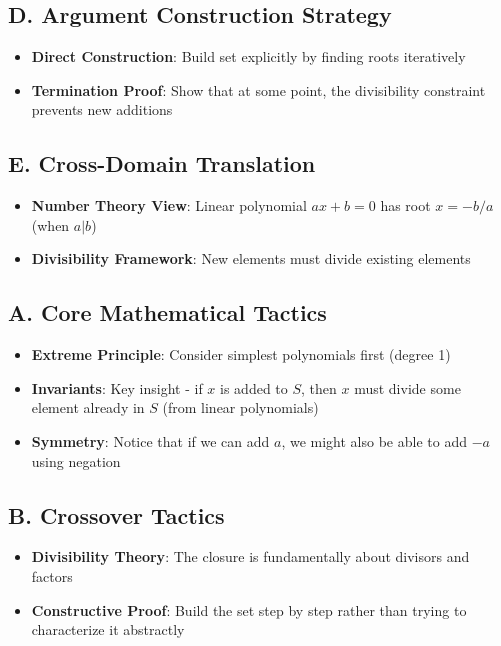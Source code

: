 \documentclass[12pt]{article}
\begin{document}
\begin{strategicbox}
\subsection*{D. Argument Construction Strategy}
\begin{itemize}[leftmargin=*]
    \item \textbf{Direct Construction}: Build set explicitly by finding roots iteratively
    \item \textbf{Termination Proof}: Show that at some point, the divisibility constraint prevents new additions
\end{itemize}

\subsection*{E. Cross-Domain Translation}
\begin{itemize}[leftmargin=*]
    \item \textbf{Number Theory View}: Linear polynomial $ax + b = 0$ has root $x = -b/a$ (when $a | b$)
    \item \textbf{Divisibility Framework}: New elements must divide existing elements
\end{itemize}
\end{strategicbox}

\begin{tacticalbox}
\subsection*{A. Core Mathematical Tactics}
\begin{itemize}[leftmargin=*]
    \item \textbf{Extreme Principle}: Consider simplest polynomials first (degree 1)
    \item \textbf{Invariants}: Key insight - if $x$ is added to $S$, then $x$ must divide some element already in $S$ (from linear polynomials)
    \item \textbf{Symmetry}: Notice that if we can add $a$, we might also be able to add $-a$ using negation
\end{itemize}

\subsection*{B. Crossover Tactics}
\begin{itemize}[leftmargin=*]
    \item \textbf{Divisibility Theory}: The closure is fundamentally about divisors and factors
    \item \textbf{Constructive Proof}: Build the set step by step rather than trying to characterize it abstractly
\end{itemize}
\end{tacticalbox}
\end{document}
